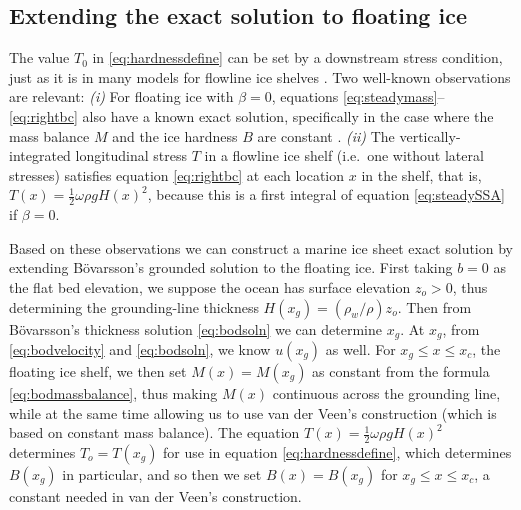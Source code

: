 \documentclass[review,letterpaper]{igs}
\renewcommand{\dh}{\fontencoding{T1}\selectfont{\symbol{240}}}
\newcommand{\bod}{B\"o\dh varsson\xspace}
\begin{document}
\subsection*{Extending the exact solution to floating ice}  The value $T_0$ in \eqref{eq:hardnessdefine} can be set by a downstream stress condition, just as it is in many models for flowline ice shelves \citep[e.g.][]{MISMIP2012,SchoofMarine1}.  Two well-known observations are relevant:  \emph{(i)}  For floating ice with $\beta=0$, equations \eqref{eq:steadymass}--\eqref{eq:rightbc} also have a known exact solution, specifically in the case where the mass balance $M$ and the ice hardness $B$ are constant \citep{vanderVeen83,vanderVeen}.  \emph{(ii)}  The vertically-integrated longitudinal stress $T$ in a flowline ice shelf (i.e.~one without lateral stresses) satisfies equation \eqref{eq:rightbc} at each location $x$ in the shelf, that is, $T(x) = \frac{1}{2} \omega \rho g H(x)^2$, because this is a first integral of equation \eqref{eq:steadySSA} if $\beta=0$.

Based on these observations we can construct a marine ice sheet exact solution by extending \bod's grounded solution to the floating ice.  First taking $b=0$ as the flat bed elevation, we suppose the ocean has surface elevation $z_o>0$, thus determining the grounding-line thickness $H(x_g) = (\rho_w/\rho) z_o$.  Then from \bod's thickness solution \eqref{eq:bodsoln} we can determine $x_g$.  At $x_g$, from \eqref{eq:bodvelocity} and \eqref{eq:bodsoln}, we know $u(x_g)$ as well.  For $x_g \le x \le x_c$, the floating ice shelf, we then set $M(x) = M(x_g)$ as constant from the formula \eqref{eq:bodmassbalance}, thus making $M(x)$ continuous across the grounding line, while at the same time allowing us to use van der Veen's construction (which is based on constant mass balance).  The equation $T(x) = \frac{1}{2} \omega \rho g H(x)^2$ determines $T_o=T(x_g)$ for use in equation \eqref{eq:hardnessdefine}, which determines $B(x_g)$ in particular, and so then we set $B(x)=B(x_g)$ for $x_g \le x \le x_c$, a constant needed in van der Veen's construction.
\end{document}
